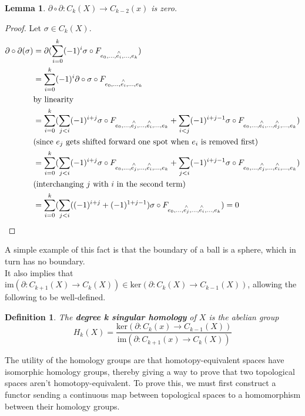 \documentclass{article}
\newtheorem{definition}[theorem]{Definition}
\newtheorem{lemma}[theorem]{Lemma}
\begin{document}
\begin{lemma}
$\partial\circ\partial\colon C_k(X)\to C_{k-2}(x)$ is zero.
\end{lemma}
\begin{proof}
Let $\sigma\in C_k(X)$.
\begin{align*}
\partial\circ\partial (\sigma)&=\partial(\sum_{i=0}^k(-1)^i\sigma\circ F_{e_0,...,\overset{\wedge}{e_i},...,e_k})\\
&=\sum_{i=0}^k(-1)^i\partial\circ\sigma\circ F_{e_0,...,\overset{\wedge}{e_i},...,e_k} \\&\text{by linearity}\\
&=\sum_{i=0}^k(\sum_{j<i}(-1)^{i+j}\sigma\circ F_{e_0,...,\overset{\wedge}{e_j},...,\overset{\wedge}{e_i},...,e_k} + \sum_{i<j}(-1)^{i+j-1}\sigma\circ F_{e_0,...,\overset{\wedge}{e_i},...,\overset{\wedge}{e_j},...,e_k}) \\&\text{(since }e_j \text{ gets shifted forward one spot when }e_i\text{ is removed first)}\\
&=\sum_{i=0}^k(\sum_{j<i}(-1)^{i+j}\sigma\circ F_{e_0,...,\overset{\wedge}{e_j},...,\overset{\wedge}{e_i},...,e_k} + \sum_{j<i}(-1)^{i+j-1}\sigma\circ F_{e_0,...,\overset{\wedge}{e_j},...,\overset{\wedge}{e_i},...,e_k})
\\&\text{(interchanging }j\text{ with }i\text{ in the second term)}\\
&=\sum_{i=0}^k(\sum_{j<i}((-1)^{i+j}+(-1)^{1+j-1})\sigma\circ F_{e_0,...,\overset{\wedge}{e_j},...,\overset{\wedge}{e_i},...,e_k})=0 \qedhere
\end{align*}
\end{proof}

\noindent A simple example of this fact is that the boundary of a ball is a sphere, which in turn has no boundary.\\
It also implies that $\text{im}(\partial:C_{k+1}(X)\rightarrow C_k(X))\in\text{ker}(\partial:C_{k}(X)\rightarrow C_{k-1}(X))$,
allowing the following to be well-defined.
\begin{definition}
The \textbf{degree k singular homology} of $X$ is the abelian group
\[H_k(X)=\frac{\text{ker}(\partial:C_{k}(x)\rightarrow C_{k-1}(X))}{\text{im}(\partial:C_{k+1}(x)\rightarrow C_k(X))}\]
\end{definition}

\noindent The utility of the homology groups are that homotopy-equivalent spaces have isomorphic homology groups, thereby giving a way to prove that two topological spaces aren't homotopy-equivalent. To prove this, we must first construct a functor sending a continuous map between topological spaces to a homomorphism between their homology groups.\\
\end{document}
